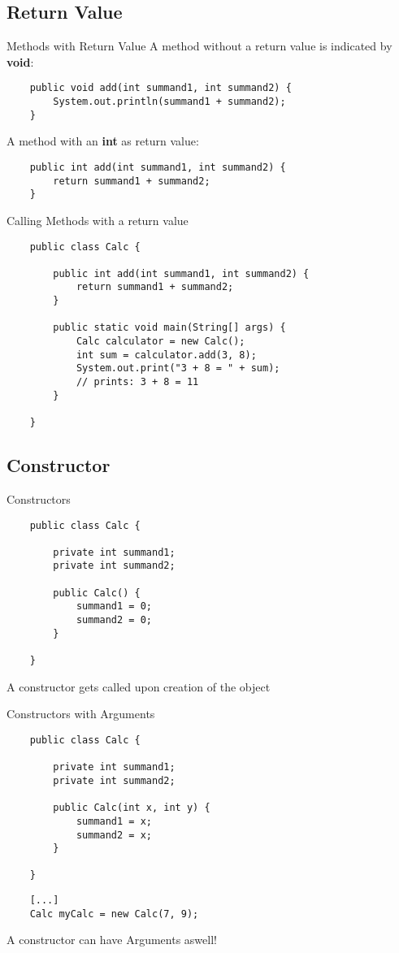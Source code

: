\subsection{Return Value}
\begin{frame}[fragile]{Methods with Return Value}
	A method without a return value is indicated by \textbf{void}:
	\begin{lstlisting}
	public void add(int summand1, int summand2) {
	    System.out.println(summand1 + summand2);
	}
	\end{lstlisting}
	A method with an \textbf{int} as return value:
	\begin{lstlisting}
	public int add(int summand1, int summand2) {
	    return summand1 + summand2;
	}
	\end{lstlisting}
\end{frame}

\begin{frame}[fragile]{Calling Methods with a return value}
	\begin{lstlisting}
	public class Calc {
	
	    public int add(int summand1, int summand2) {
	        return summand1 + summand2;
	    }
	    
	    public static void main(String[] args) {
	        Calc calculator = new Calc();
	        int sum = calculator.add(3, 8);
	        System.out.print("3 + 8 = " + sum); 
			// prints: 3 + 8 = 11
	    }
        
	}
	\end{lstlisting}
\end{frame}

\subsection{Constructor}

\begin{frame}[fragile]{Constructors}
	\begin{lstlisting}
	public class Calc {
    
		private int summand1;
		private int summand2;
	
	    public Calc() {
			summand1 = 0;
			summand2 = 0;
	    }
        
	}
	\end{lstlisting}
	A constructor gets called upon creation of the object
\end{frame}

\begin{frame}[fragile]{Constructors with Arguments}
	\begin{lstlisting}
	public class Calc {
    
		private int summand1;
		private int summand2;
	
	    public Calc(int x, int y) {
			summand1 = x;
			summand2 = x;
	    }
        
	}
	\end{lstlisting}
	\begin{lstlisting}
	[...]
	Calc myCalc = new Calc(7, 9);
	\end{lstlisting}
    
	A constructor can have Arguments aswell!
\end{frame}

